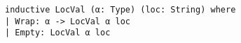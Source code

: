 \begin{lstlisting}[language=lean]
inductive LocVal (α: Type) (loc: String) where
| Wrap: α -> LocVal α loc
| Empty: LocVal α loc
\end{lstlisting}

